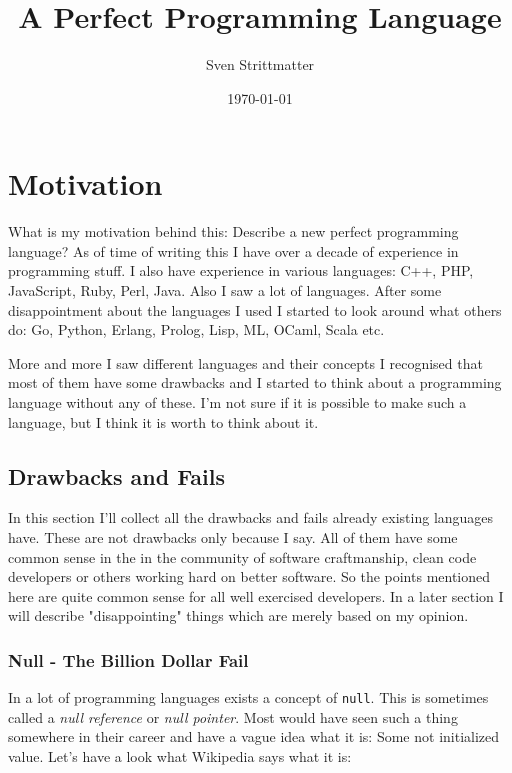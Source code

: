 \documentclass[a4paper,12pt]{article}
\title{A Perfect Programming Language}
\author{Sven Strittmatter}
\date{\today}
\begin{document}
\maketitle
{}
\newpage

\tableofcontents
\newpage

\section{Motivation}

What is my motivation behind this: Describe a new perfect programming language? As of time of writing this I have over a decade of experience in programming stuff. I also have experience in various languages: C++, PHP, JavaScript, Ruby, Perl, Java. Also I saw a lot of languages. After some disappointment about the languages I used I started to look around what others do: Go, Python, Erlang, Prolog, Lisp, ML, OCaml, Scala etc.

More and more I saw different languages and their concepts I recognised that most of them have some drawbacks and I started to think about a programming language without any of these. I'm not sure if it is possible to make such a language, but I think it is worth to think about it.

\subsection{Drawbacks and Fails}

In this section I'll collect all the drawbacks and fails already existing languages have. These are not drawbacks only because I say. All of them have some common sense in the in the community of software craftmanship, clean code developers or others working hard on better software. So the points mentioned here are quite common sense for all well exercised developers. In a later section I will describe "disappointing" things which are merely based on my opinion.

\subsubsection{Null - The Billion Dollar Fail}

In a lot of programming languages exists a concept of \verb|null|. This is sometimes called a \textit{null reference} or \textit{null pointer}. Most would have seen such a thing somewhere in their career and have a vague idea what it is: Some not initialized value. Let's have a look what Wikipedia\cite{null-wiki} says what it is:
\end{document}
